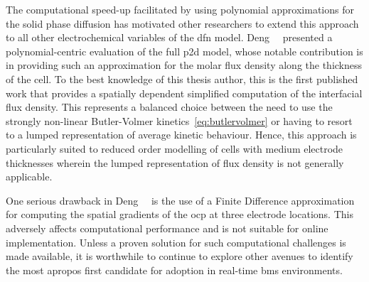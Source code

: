 

The computational  speed-up facilitated  by using polynomial  approximations for
the  solid  phase diffusion  has  motivated  other  researchers to  extend  this
approach  to  all  other  electrochemical  variables  of  the  \gls{dfn}  model.
Deng~\etal{}~\cite{Deng2018}  presented a  polynomial-centric evaluation  of the
full  \gls{p2d}  model, whose  notable  contribution  is  in providing  such  an
approximation for the molar flux density along the thickness of the cell. To the
best knowledge  of this  thesis author,  this is the  first published  work that
provides a  spatially dependent simplified  computation of the  interfacial flux
density. This represents a balanced choice  between the need to use the strongly
non-linear Butler-Volmer kinetics~\cref{eq:butlervolmer} or  having to resort to
a lumped  representation of average  kinetic behaviour. Hence, this  approach is
particularly suited  to reduced order  modelling of cells with  medium electrode
thicknesses wherein the  lumped representation of flux density  is not generally
applicable.



One  serious drawback  in Deng~\etal{}~\cite{Deng2018}  is the  use of  a Finite
Difference approximation for computing the spatial gradients of the \gls{ocp} at
three electrode locations. This  adversely affects computational performance and
is not  suitable for online  implementation. Unless  a proven solution  for such
computational  challenges is  made available,  it is  worthwhile to  continue to
explore other avenues to identify the  most apropos first candidate for adoption
in real-time \gls{bms} environments.


